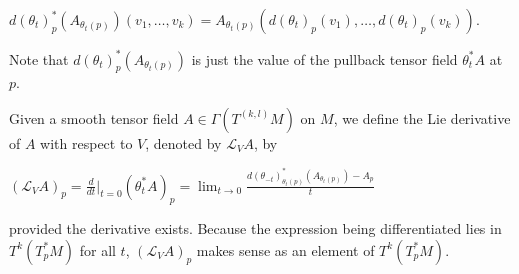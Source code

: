 \(d(\theta_t)_p^* (A_{\theta_t(p)})(v_1, \dots, v_k) = A_{\theta_t(p)} (d(\theta_t)_p(v_1), \dots, d(\theta_t)_p(v_k)).\)

Note that \(d(\theta_t)_p^* (A_{\theta_t(p)})\) is just the value of the pullback tensor field \(\theta_t^* A\) at \(p\).

Given a smooth tensor field \(A \in \Gamma(T^{(k,l)}M)\) on \(M\), we define the Lie derivative of \(A\)
with respect to \(V\), denoted by \(\mathcal{L}_V A\), by

\((\mathcal{L}_V A)_p = \frac{d}{dt}\bigg|_{t=0} (\theta_t^* A)_p 
= \lim_{t \to 0} \frac{d(\theta_{-t})_{\theta_t(p)}^* (A_{\theta_t(p)}) - A_p}{t}\)

provided the derivative exists.
Because the expression being differentiated lies in \(T^k (T_p^* M)\) for all \(t\), 
\((\mathcal{L}_V A)_p\) makes sense as an element of \(T^k (T_p^* M)\).
